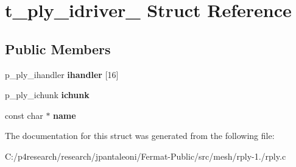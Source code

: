 \hypertarget{structt__ply__idriver__}{}\section{t\+\_\+ply\+\_\+idriver\+\_\+ Struct Reference}
\label{structt__ply__idriver__}
\subsection*{Public Members}
\begin{DoxyCompactItemize}
\item 
\mbox{\label{structt__ply__idriver___afabd4f3eef6f708d9872c623f5d48324}} 
p\+\_\+ply\+\_\+ihandler {\bfseries ihandler} \mbox{[}16\mbox{]}
\item 
\mbox{\label{structt__ply__idriver___a317e387dd6c97231d081c71b5e705b28}} 
p\+\_\+ply\+\_\+ichunk {\bfseries ichunk}
\item 
\mbox{\label{structt__ply__idriver___a51009fbc3df6433214fd19a34f0aac02}} 
const char $\ast$ {\bfseries name}
\end{DoxyCompactItemize}


The documentation for this struct was generated from the following file\+:\begin{DoxyCompactItemize}
\item 
C\+:/p4research/research/jpantaleoni/\+Fermat-\/\+Public/src/mesh/rply-\/1./rply.\+c\end{DoxyCompactItemize}

